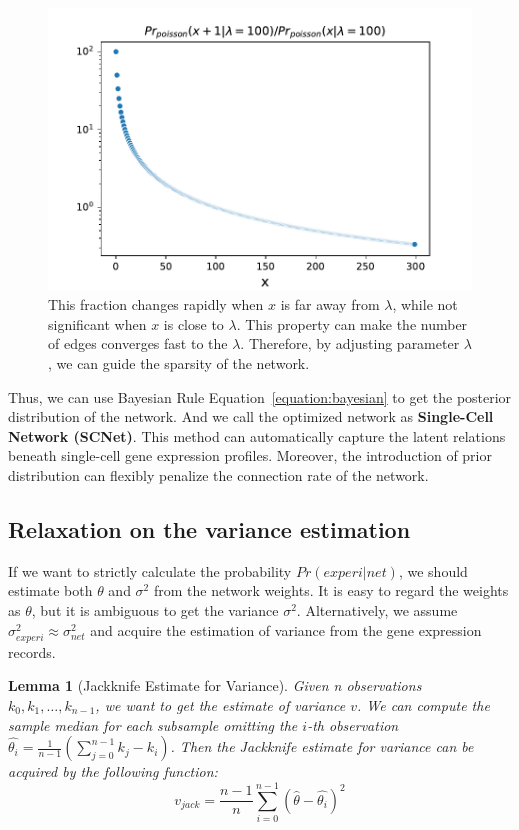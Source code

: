 \documentclass{bioinfo}
\newtheorem{lemma}{Lemma}
\begin{document}
\begin{figure}[H]
\centering
  \includegraphics[width=\columnwidth]{figure/whypoisson.pdf}
  \caption{This fraction changes rapidly when $x$ is far away from $\lambda$, while not significant when $x$ is close to $\lambda$. This property can make the number of edges converges fast to the $\lambda$. Therefore, by adjusting parameter $\lambda$, we can guide the sparsity of the network.}
    \label{figure:whypoisson}
\end{figure}

Thus, we can use Bayesian Rule Equation~\ref{equation:bayesian} to get the posterior distribution of the network. And we call the optimized network as {\bf{Single-Cell Network (SCNet)}}. This method can automatically capture the latent relations beneath single-cell gene expression profiles. Moreover, the introduction of prior distribution can flexibly penalize the connection rate of the network.


\subsection{Relaxation on the variance estimation}

If we want to strictly calculate the probability $Pr(experi|net)$, we should estimate both $\theta$ and $\sigma^2$ from the network weights. It is easy to regard the weights as $\theta$, but it is ambiguous to get the variance $\sigma^2$. Alternatively, we assume $\sigma_{experi}^2\approx \sigma_{net}^2$ and acquire the estimation of variance from the gene expression records.

\begin{lemma}[Jackknife Estimate for Variance]
Given n observations $k_0, k_1, \ldots, k_{n-1}$, we want to get the estimate of variance $v$. We can compute the sample median for each subsample omitting the $i$-th observation $\hat{\theta_{i}}=\frac{1}{n-1}(\sum_{j=0}^{n-1} k_j - k_i)$. Then the Jackknife estimate for variance can be acquired by the following function:
\begin{equation}\label{equation:jack}
    v_{jack} = \frac{n-1}{n}\sum_{i=0}^{n-1} (\hat{\theta} - \hat{\theta_{i}})^2
\end{equation}
\end{lemma}
\end{document}
